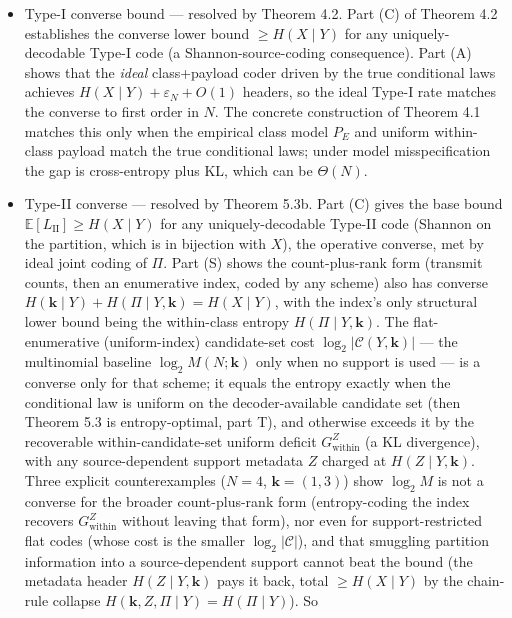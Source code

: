 \documentclass[
]{article}
\begin{document}
\begin{itemize}
\item
  Type-I converse bound --- resolved by Theorem 4.2. Part (C) of
  Theorem 4.2 establishes the converse lower bound
  $\geq H(X \mid Y)$ for any uniquely-decodable Type-I code (a
  Shannon-source-coding consequence). Part (A) shows that the
  \emph{ideal} class+payload coder driven by the true conditional
  laws achieves $H(X \mid Y) + \varepsilon_N + O(1)$ headers, so
  the ideal Type-I rate matches the converse to first order in $N$.
  The concrete construction of Theorem 4.1 matches this only when
  the empirical class model $P_E$ and uniform within-class payload
  match the true conditional laws; under model misspecification the
  gap is cross-entropy plus KL, which can be $\Theta(N)$.
\item
  Type-II converse --- resolved by Theorem 5.3b. Part (C) gives the
  base bound $\mathbb{E}[L_{\mathrm{II}}] \geq H(X \mid Y)$ for any
  uniquely-decodable Type-II code (Shannon on the partition, which is
  in bijection with $X$), the operative converse, met by ideal joint
  coding of $\Pi$. Part (S) shows the count-plus-rank form (transmit
  counts, then an enumerative index, coded by any scheme) also has
  converse $H(\mathbf{k} \mid Y) + H(\Pi \mid Y, \mathbf{k}) = H(X \mid Y)$,
  with the index's only structural lower bound being the within-class
  entropy $H(\Pi \mid Y, \mathbf{k})$. The flat-enumerative
  (uniform-index) candidate-set cost $\log_2 |\mathcal{C}(Y,\mathbf{k})|$
  --- the multinomial baseline $\log_2 M(N; \mathbf{k})$ only when no
  support is used --- is a converse only for that scheme; it equals the
  entropy exactly when the conditional law is uniform on the
  decoder-available candidate set (then Theorem 5.3 is entropy-optimal,
  part T), and otherwise exceeds it by the recoverable
  within-candidate-set uniform deficit $G_{\mathrm{within}}^{Z}$ (a KL
  divergence), with any source-dependent support metadata $Z$ charged at
  $H(Z \mid Y, \mathbf{k})$. Three explicit counterexamples ($N=4$,
  $\mathbf{k}=(1,3)$) show $\log_2 M$ is not a converse for the broader
  count-plus-rank form (entropy-coding the index recovers
  $G_{\mathrm{within}}^{Z}$ without leaving that form), nor even for
  support-restricted flat codes (whose cost is the smaller
  $\log_2 |\mathcal{C}|$), and that smuggling partition information into a
  source-dependent support cannot beat the bound (the metadata header
  $H(Z \mid Y, \mathbf{k})$ pays it back, total $\geq H(X \mid Y)$ by the
  chain-rule collapse $H(\mathbf{k}, Z, \Pi \mid Y) = H(\Pi \mid Y)$). So

\end{itemize}
\end{document}
